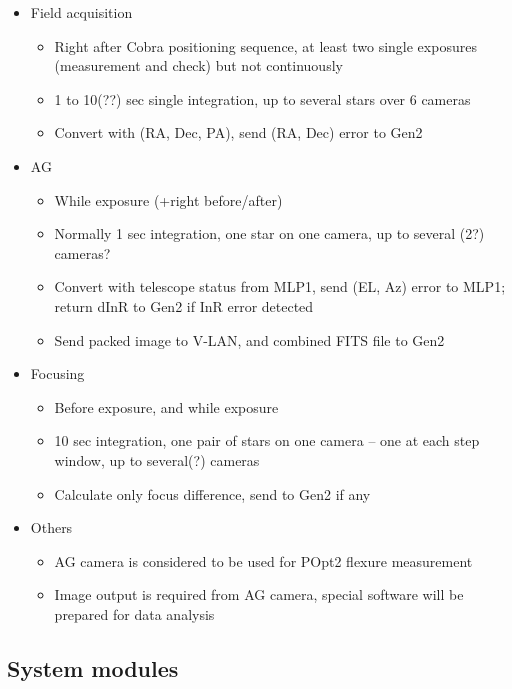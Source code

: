 \documentclass[a4paper,notitlepage]{article}
\begin{document}
\begin{itemize}
  \item Field acquisition
  \begin{itemize}
    \item Right after Cobra positioning sequence, at least two single exposures 
      (measurement and check) but not continuously
    \item 1 to 10(??) sec single integration, up to several stars over 6 cameras
    \item Convert with (RA, Dec, PA), send (RA, Dec) error to Gen2
  \end{itemize}
  \item AG
  \begin{itemize}
    \item While exposure (+right before/after)
    \item Normally 1 sec integration, one star on one camera, up to several (2?) cameras?
    \item Convert with telescope status from MLP1, send (EL, Az) error to MLP1; return dInR to Gen2 if InR error detected
    \item Send packed image to V-LAN, and combined FITS file to Gen2
  \end{itemize}
  \item Focusing
  \begin{itemize}
    \item Before exposure, and while exposure
    \item 10 sec integration, one pair of stars on one camera -- one at each step window, up to several(?) cameras
    \item Calculate only focus difference, send to Gen2 if any
  \end{itemize}
  \item Others
  \begin{itemize}
    \item AG camera is considered to be used for POpt2 flexure measurement
    \item Image output is required from AG camera, special software will be prepared for data analysis
  \end{itemize}
\end{itemize}

\subsection{System modules}
\end{document}
